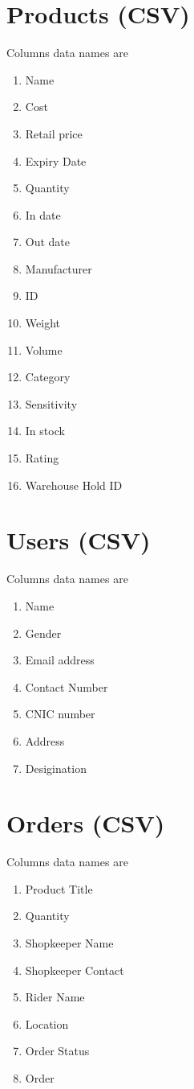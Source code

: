 \documentclass[12pt,a4paper]{article}
\begin{document}
\section*{Products (CSV)}
Columns data names are
\begin{enumerate}
\item Name
\item Cost
\item Retail price
\item Expiry Date
\item Quantity
\item In date 
\item Out date
\item Manufacturer 
\item ID
\item Weight
\item Volume
\item Category
\item Sensitivity
\item In stock
\item Rating
\item Warehouse Hold ID
\end{enumerate}

\section*{Users (CSV)}
Columns data names are
\begin{enumerate}
\item Name 
\item Gender
\item Email address
\item Contact Number
\item CNIC number
\item Address
\item Desigination 
\end{enumerate}

\section*{Orders (CSV)}
Columns data names are
\begin{enumerate}
\item Product Title
\item Quantity
\item Shopkeeper Name
\item Shopkeeper Contact 
\item Rider Name 
\item Location 
\item Order Status
\item Order 
\end{enumerate}
\end{document}
